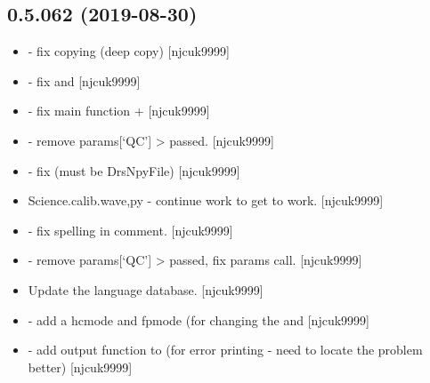 \documentclass[a4paper,10pt,english]{report}
\begin{document}
\subsection{0.5.062 (2019-08-30)}
\label{\detokenize{misc/changelog:id81}}\begin{itemize}
\item {} 
 - fix copying (deep copy)
{[}njcuk9999{]}

\item {} 
 - fix  and  {[}njcuk9999{]}

\item {} 
 - fix main function  +  {[}njcuk9999{]}

\item {} 
 - remove params{[}‘QC’{]} \textendash{}\textgreater{} passed. {[}njcuk9999{]}

\item {} 
 - fix  (must be DrsNpyFile)
{[}njcuk9999{]}

\item {} 
Science.calib.wave,py - continue work to get  to
work. {[}njcuk9999{]}

\item {} 
 - fix spelling in comment. {[}njcuk9999{]}

\item {} 
 - remove params{[}‘QC’{]} \textendash{}\textgreater{} passed, fix 
params call. {[}njcuk9999{]}

\item {} 
Update the language database. {[}njcuk9999{]}

\item {} 
 - add a hcmode and
fpmode (for changing the  and  {[}njcuk9999{]}

\item {} 
 - add output function to  (for error
printing - need to locate the problem better) {[}njcuk9999{]}


\end{itemize}
\end{document}
